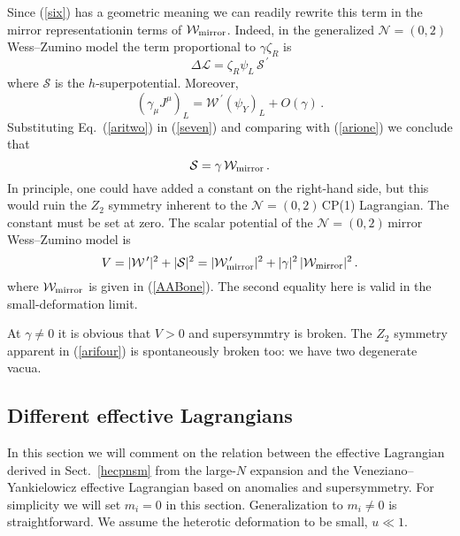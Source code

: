 \documentclass[epsfig,12pt]{article}
\def\beq{\begin{equation}}
\def\eeq{\end{equation}}
\newcommand{\nzt}{${\mathcal N}=(0,2)\,$}
\newcommand{\cell}{{\mathcal L}}
\newcommand{\cw}{{\mathcal W}}
\newcommand{\cs}{{\mathcal S}}
\def\beq{\begin{equation}}
\def\eeq{\end{equation}}
\begin{document}
{Since (\ref{six}) has a geometric meaning we can readily rewrite this term in the mirror representationin terms of 
${\mathcal W}_{\rm mirror}$.
 Indeed, in the generalized \nzt Wess--Zumino model the term proportional to $\gamma \zeta_R$ is
 \cite{SYneww}
 \beq
 \Delta\cell = \zeta_R \psi_L\,{\mathcal S}^{\,\prime}
 \label{arione}
 \eeq
 where ${\mathcal S}$ is the $h$-superpotential. Moreover,
 \beq
 \left(\gamma_\mu J^\mu\right)_L = {\mathcal W}^{\,\prime} \left(\psi_Y\right)_{L} +O(\gamma)\,.
  \label{aritwo}
 \eeq
Substituting Eq.~(\ref{aritwo}) in (\ref{seven}) and comparing with (\ref{arione}) we conclude that
\beq
{\mathcal S} = \gamma\,{\mathcal W}_{\rm mirror}\,.
  \label{arithree}
 \eeq
 In principle, one could have added a constant on the right-hand side, but this would ruin the $Z_2$ 
 symmetry inherent to the \nzt CP(1) Lagrangian. The constant must be set at zero. 
 The scalar potential of the \nzt mirror Wess--Zumino model 
  is \cite{SYneww}
 \beq
 V= |\cw^{\,\prime} |^2+|\cs|^2 = |\cw^{\,\prime}_{\rm mirror} |^2 +|\gamma |^2\,|\cw_{\rm mirror} |^2\,.
   \label{arifour}
 \eeq
 where $\cw_{\rm mirror} $ is given in (\ref{AABone}).
 The second equality here is valid in the small-deformation limit.
 
At $\gamma \neq 0$ it is obvious that $V>0$ and supersymmtry is broken.
The $Z_2$ symmetry apparent in (\ref{arifour}) is spontaneously broken too:
we have two degenerate vacua.



\subsection{Different effective Lagrangians}
\label{defefl}

In this section we will comment on the relation between the
effective Lagrangian derived in Sect.~\ref{hecpnsm} from the large-$N$ expansion
 and the Veneziano--Yankielowicz
effective Lagrangian based on  anomalies and supersymmetry.
For simplicity we will set $m_i =0$ in this section. 
Generalization to  $m_i \neq 0$ is straightforward. We  assume the heterotic deformation to be small, $u\ll1$.

}
\end{document}
